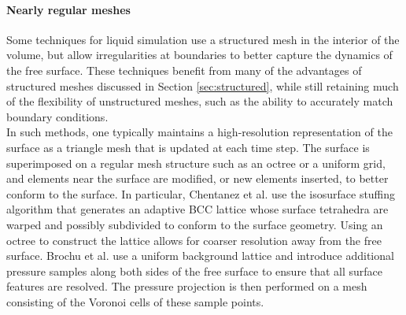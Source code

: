 \paragraph*{Nearly regular meshes}
Some techniques for liquid simulation use a structured mesh in the interior of the volume, but allow irregularities at boundaries to better capture the dynamics of the free surface.
These techniques benefit from many of the advantages of structured meshes discussed in Section \ref{sec:structured}, while still retaining much of the flexibility of unstructured meshes, such as the ability to accurately match boundary conditions.
\\
In such methods, one typically maintains a high-resolution representation of the surface as a triangle mesh that is updated at each time step.
The surface is superimposed on a regular mesh structure such as an octree or a uniform grid, and elements near the surface are modified, or new elements inserted, to better conform to the surface.
In particular, Chentanez et al. \cite{Chentanez2007} use the isosurface stuffing algorithm \cite{Labelle2007} that generates an adaptive BCC lattice whose surface tetrahedra are warped and possibly subdivided to conform to the surface geometry.
Using an octree to construct the lattice allows for coarser resolution away from the free surface.
Brochu et al. \cite{Brochu2010} use a uniform background lattice and introduce additional pressure samples along both sides of the free surface to ensure that all surface features are resolved.
The pressure projection is then performed on a mesh consisting of the Voronoi cells of these sample points.


